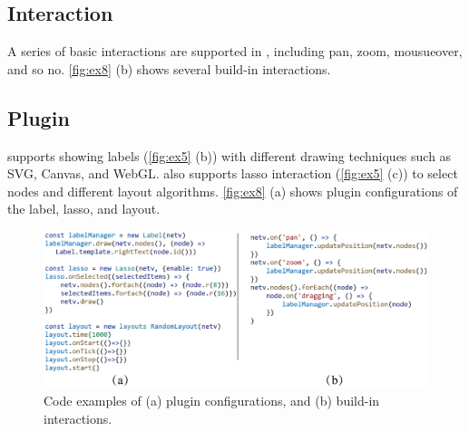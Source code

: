 

\subsection{Interaction}
A series of basic interactions are supported in \name, including pan, zoom, mousueover, and so no. \autoref{fig:ex8} (b) shows several build-in interactions.

\subsection{Plugin}

\name supports showing labels (\autoref{fig:ex5} (b)) with different drawing techniques such as SVG, Canvas, and WebGL. \name also supports lasso interaction (\autoref{fig:ex5} (c)) to select nodes and different layout algorithms. \autoref{fig:ex8} (a) shows plugin configurations of the label, lasso, and layout.


\begin{figure}
    \includegraphics[width=\linewidth]{fig/ex8.eps}
    \caption{
        Code examples of (a) plugin configurations, and (b) build-in interactions.
    }
    \label{fig:ex8}
\end{figure}


